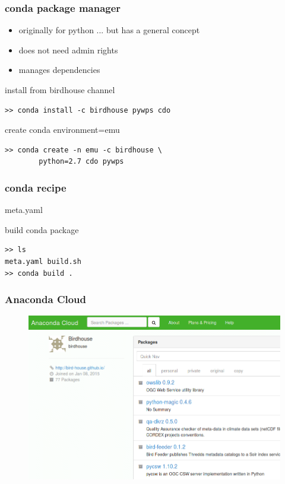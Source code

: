 \documentclass{beamer}
\begin{document}

  \begin{frame}[fragile]
    \frametitle{conda package manager}
    \begin{itemize}
      \item originally for python ... but has a general concept
      \item does not need admin rights
      \item manages dependencies
    \end{itemize}
    \begin{block}{install from birdhouse channel}
      \begin{verbatim}
>> conda install -c birdhouse pywps cdo 
      \end{verbatim}
    \end{block}
    \begin{block}{create conda environment=emu}
      \begin{verbatim}
>> conda create -n emu -c birdhouse \
        python=2.7 cdo pywps 
      \end{verbatim}
    \end{block}
\end{frame}


  \begin{frame}[fragile]
    \frametitle{conda recipe}
    \begin{block}{meta.yaml}
      
    \end{block}
    \begin{block}{build conda package}
      \begin{verbatim}
>> ls  
meta.yaml build.sh
>> conda build .
      \end{verbatim}
    \end{block}
\end{frame}


  \begin{frame}[plain]
    \frametitle{Anaconda Cloud}
    \begin{figure}
      \includegraphics[width=11.5cm]{images/anaconda-cloud.png}
    \end{figure}
  \end{frame}
\end{document}
